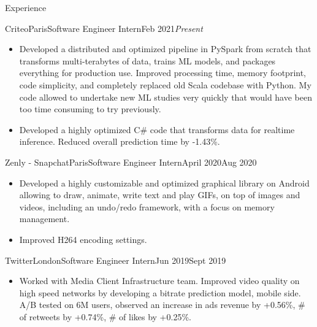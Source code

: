 \documentclass{resume}
\begin{document}
	\begin{rSection}{Experience}
        \begin{job}{Criteo}{Paris}{Software Engineer Intern}{Feb 2021}{\em{Present}}{
            \begin{itemize}
                \item Developed a distributed and optimized pipeline in PySpark from scratch that transforms multi-terabytes of data, trains ML models, and packages everything for production use. Improved processing time, memory footprint, code simplicity, and completely replaced old Scala codebase with Python. My code allowed to undertake new ML studies very quickly that would have been too time consuming to try previously.
                \item Developed a highly optimized C\# code that transforms data for realtime inference. Reduced overall prediction time by -1.43\%.
            \end{itemize}
        }
        \end{job}

        \begin{job}{Zenly - Snapchat}{Paris}{Software Engineer Intern}{April 2020}{Aug 2020}{
            \begin{itemize}
                \item Developed a highly customizable and optimized graphical library on Android allowing to draw, animate, write text and play GIFs, on top of images and videos, including an undo/redo framework, with a focus on memory management.
                \item Improved H264 encoding settings.
            \end{itemize}
        }
        \end{job}

        \begin{job}{Twitter}{London}{Software Engineer Intern}{Jun 2019}{Sept 2019}{
            \begin{itemize}
                \item Worked with Media Client Infrastructure team. Improved video quality on high speed networks by developing a bitrate prediction model, mobile side. A/B tested on 6M users, observed an increase in ads revenue by +0.56\%, \# of retweets by +0.74\%, \# of likes by +0.25\%.
            \end{itemize}
        }
        \end{job}


\end{rSection}
\end{document}
